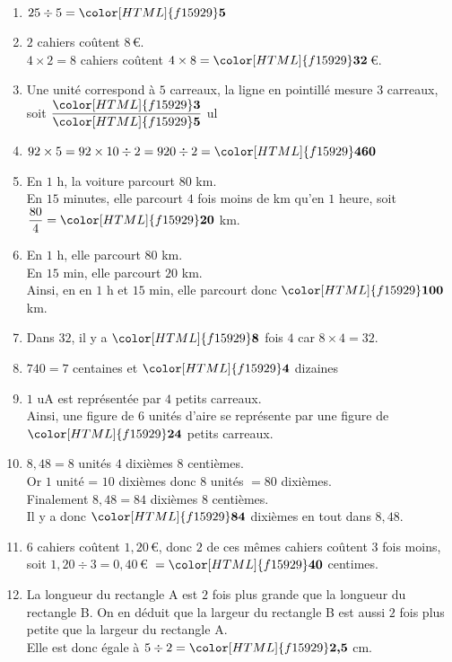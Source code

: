 \begin{Correction}
\begin{EXO}{}{}
\begin{enumerate}[itemsep=1em, label=\arabic*)]
\item $25\div 5={\color[HTML]{f15929}\boldsymbol{5}}$
\item $2$ cahiers coûtent $8$\,\euro{}.\\ $4\times2=8$ cahiers coûtent $4\times8={\color[HTML]{f15929}\boldsymbol{32}}$\,\euro{}.
\item Une unité correspond à $5$ carreaux, la ligne en pointillé mesure $3$ carreaux, soit $\dfrac{{\color[HTML]{f15929}\boldsymbol{3}}}{{\color[HTML]{f15929}\boldsymbol{5}}}$ ul 
\item $92\times 5=92\times 10 \div 2=920\div 2={\color[HTML]{f15929}\boldsymbol{460}}$
\item En $1$ h, la voiture parcourt $80$ km.\\
        En $15$ minutes, elle parcourt $4$ fois moins de km qu'en $1$ heure, soit $\dfrac{80}{4}=
        {\color[HTML]{f15929}\boldsymbol{20}}$ km.
\item En $1$ h, elle parcourt $80$ km.\\
        En $15$ min, elle parcourt $20$ km.\\
        Ainsi, en en $1$ h et $15$ min, elle parcourt donc ${\color[HTML]{f15929}\boldsymbol{100}}$ km.
\item Dans $32$, il y a ${\color[HTML]{f15929}\boldsymbol{8}}$ fois $4$ car $8\times 4=32$.
\item $740 = 7$ centaines et ${\color[HTML]{f15929}\boldsymbol{4}}$ dizaines
\item $1$ uA est représentée par $4$ petits carreaux. \\Ainsi, une figure de 6 unités d'aire se représente par une figure de ${\color[HTML]{f15929}\boldsymbol{24}}$ petits carreaux.
\item $8{,}48 = 8$ unités $4$ dixièmes $8$ centièmes.\\Or $1$ unité = $10$ dixièmes donc $8$ unités $= 80$ dixièmes.\\Finalement $8{,}48 = 84$ dixièmes $8$ centièmes.\\Il y a donc ${\color[HTML]{f15929}\boldsymbol{84}}$ dixièmes en tout dans $8{,}48$.
\item $6$ cahiers coûtent  $1{,}20$\,\euro{}, donc $2$ de ces mêmes cahiers coûtent  $3$ fois moins, soit $ 1{,}20\div3=0{,}40$\,\euro{}~$={\color[HTML]{f15929}\boldsymbol{40}}$ centimes.
\item La longueur du rectangle A est $2$ fois plus grande que la longueur du rectangle B. On en déduit que la largeur  du rectangle B est aussi $2$ fois plus petite que la largeur du rectangle A.\\
Elle est donc égale à $5\div 2={\color[HTML]{f15929}\boldsymbol{2{,}5}}$ cm.
                        

\end{enumerate}
\end{EXO}
\end{Correction}
